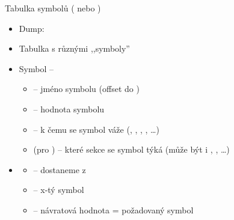 \begin{frame}{Tabulka symbolů ( nebo )}

  \begin{itemize}
    \item Dump: 
    \item Tabulka s různými ,,symboly''

    \pause

    \item Symbol -- 
    \begin{itemize}[<+->]
      \item {} -- jméno symbolu (offset do )
      \item {} -- hodnota symbolu
      \item {} -- k čemu se symbol váže
	(, , ,
	, \dots)
      \item {} (pro ) -- které sekce se symbol
	týká (může být i , , \dots)
    \end{itemize}

    \pause

    \item {}
    \begin{itemize}
      \item {} -- dostaneme z 
      \item {} -- x-tý symbol
      \item {} -- návratová hodnota = požadovaný symbol
    \end{itemize}
  \end{itemize}

\end{frame}

